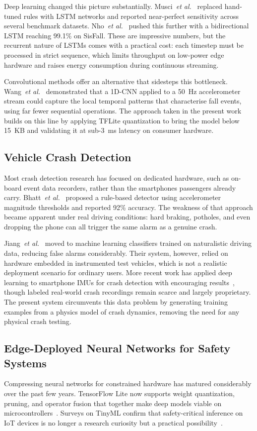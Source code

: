 \documentclass[journal]{IEEEtran}
\begin{document}
Deep learning changed this picture substantially. Musci~\textit{et al.}~\cite{musci2020}
replaced hand-tuned rules with LSTM networks and reported near-perfect sensitivity
across several benchmark datasets. Nho~\textit{et al.}~\cite{nho2021} pushed
this further with a bidirectional LSTM reaching 99.1\% on SisFall. These are
impressive numbers, but the recurrent nature of LSTMs comes with a practical
cost: each timestep must be processed in strict sequence, which limits throughput
on low-power edge hardware and raises energy consumption during continuous
streaming.

Convolutional methods offer an alternative that sidesteps this bottleneck.
Wang~\textit{et al.}~\cite{wang2020cnn} demonstrated that a 1D-CNN applied
to a 50~Hz accelerometer stream could capture the local temporal patterns
that characterise fall events, using far fewer sequential operations. The
approach taken in the present work builds on this line by applying TFLite
quantization to bring the model below 15~KB and validating it at sub-3~ms
latency on consumer hardware.

\subsection{Vehicle Crash Detection}
Most crash detection research has focused on dedicated hardware, such as
on-board event data recorders, rather than the smartphones passengers
already carry. Bhatt~\textit{et al.}~\cite{bhatt2017} proposed a rule-based
detector using accelerometer magnitude thresholds and reported 92\% accuracy.
The weakness of that approach became apparent under real driving conditions:
hard braking, potholes, and even dropping the phone can all trigger the same
alarm as a genuine crash.

Jiang~\textit{et al.}~\cite{jiang2020} moved to machine learning classifiers
trained on naturalistic driving data, reducing false alarms considerably.
Their system, however, relied on hardware embedded in instrumented test vehicles,
which is not a realistic deployment scenario for ordinary users. More recent
work has applied deep learning to smartphone IMUs for crash detection with
encouraging results~\cite{smartphone_crash2024}, though labeled real-world
crash recordings remain scarce and largely proprietary. The present system
circumvents this data problem by generating training examples from a physics
model of crash dynamics, removing the need for any physical crash testing.

\subsection{Edge-Deployed Neural Networks for Safety Systems}
Compressing neural networks for constrained hardware has matured considerably
over the past few years. TensorFlow Lite now supports weight quantization,
pruning, and operator fusion that together make deep models viable on
microcontrollers~\cite{tflite_micro,tinyml2023}. Surveys on TinyML confirm
that safety-critical inference on IoT devices is no longer a research curiosity
but a practical possibility~\cite{edge_safety2024}.
\end{document}
